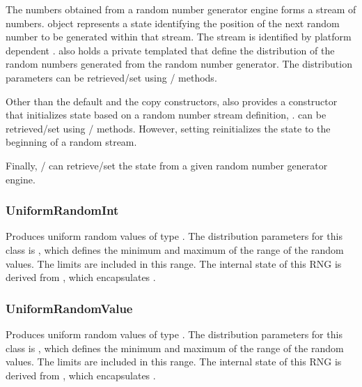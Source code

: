 The numbers obtained from a random number generator engine forms a stream of numbers.  object represents a state identifying the position of the next random number to be generated within that stream. The stream is identified by platform dependent .   also holds a private templated  that define the distribution of the random numbers generated from the random number generator. The distribution parameters can be retrieved/set using / methods. 

Other than the default and the copy constructors,  also provides a constructor that initializes state based on a random number stream definition, .
 can be retrieved/set using / methods. However, setting 
 reinitializes the state to the beginning of a random stream.

Finally, / can retrieve/set the state from a given random number generator engine. 

\subsubsection{UniformRandomInt}
Produces uniform random values of type . The distribution  parameters for this class is , which defines the minimum and maximum of the range of the random values. The limits are included in this range. The internal state of this RNG is derived from , which encapsulates .

\subsubsection{UniformRandomValue}
Produces uniform random values of type . The distribution  parameters for this class is , which defines the minimum and maximum of the range of the random values. The limits are included in this range. The internal state of this RNG is derived from , which encapsulates .





